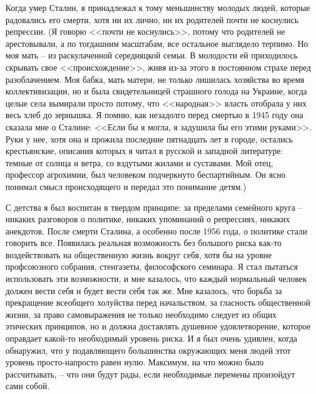 \documentclass{book}
\begin{document}
Когда умер Сталин, я принадлежал к тому меньшинству мо­лодых людей, которые радовались его смерти, хотя ни их лично, ни их родителей почти не коснулись репрессии. (Я говорю <<почти не коснулись>>, потому что родителей не арестовывали, а по тогдашним масштабам, все остальное выглядело терпимо. Но моя мать -- из раскулаченной середняцкой семьи. В молодости ей приходилось скрывать свое <<происхождение>>, живя из-за этого в постоянном страхе перед разоблачением. Моя бабка, мать матери, не только лишилась хозяйства во время коллекти­визации, но и была свидетельницей страшного голода на Укра­ине, когда целые села вымирали просто потому, что <<народ­ная>> власть отобрала у них весь хлеб до зернышка. Я помню, как незадолго перед смертью в 1945 году она сказала мне о Сталине: <<Если бы я могла, я задушила бы его этими руками>>. Руки у нее, хотя она и прожила последние пятнадцать лет в го­роде, остались крестьянские, описания которых я читал в русской и западной литературе: темные от солнца и ветра, со вздутыми жилами 
и суставами. Мой отец, профессор агрохимии, был человеком подчеркнуто беспартийным. Он ясно понимал смысл происходящего и передал это понимание детям.)

С детства я был воспитан в твердом принципе: за пределами семейного круга -- никаких разговоров о политике, никаких упоминаний о репрессиях, никаких анекдотов. После смерти Сталина, а особенно после 1956 года, о политике стали говорить все. Появилась реальная возможность без большого риска как-то воздействовать на общественную жизнь вокруг себя, хотя бы на уровне профсоюзного собрания, стенгазеты, фило­софского семинара. Я стал пытаться использовать эти возмож­ности, и мне казалось, что каждый нормальный человек должен вести себя и будет вести себя так же. Мне казалось, что борьба за прекращение всеобщего холуйства перед начальством, за гласность общественной жизни, за право самовыражения не только необходимо следует из общих этических принципов, но и должна доставлять душевное удовлетворение, которое оправдает какой-то необходимый уровень риска. И я был очень удивлен, когда обнаружил, что у подавляющего большинства окружающих меня людей этот уровень просто-напросто равен нулю. Максимум, на что можно было 
рассчитывать, -- что они будут рады, если необходимые перемены произойдут сами собой.
\end{document}

